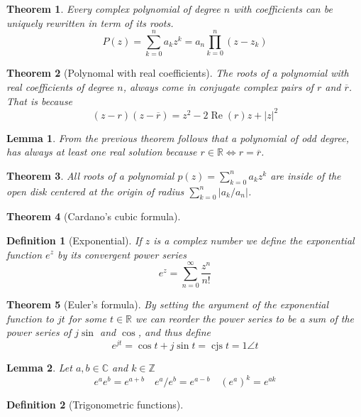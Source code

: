 \documentclass[twocolumn, margin=normal]{tex/hsrzf}
\newcommand\Zset{\mathbb{Z}}
\newcommand\Rset{\mathbb{R}}
\newcommand\Cset{\mathbb{C}}
\DeclareMathOperator\cjs{cjs}
\newcommand\conj[1]{\overline{#1}}
\newcommand\len[1]{\lvert#1\rvert}
\renewcommand\Re{\operatorname{Re}}
\theoremstyle{komfourzf}
\newtheorem{theorem}{Theorem}
\newtheorem{definition}{Definition}
\newtheorem{lemma}{Lemma}
\begin{document}
\begin{theorem}
  Every complex polynomial of degree \(n\) with coefficients can be \emph{uniquely} rewritten in term of its roots.
  \[
    P(z) = \sum_{k=0}^n a_k z^k = a_n \prod_{k=0}^{n} (z - z_k)
  \]
\end{theorem}

\begin{theorem}[Polynomal with real coefficients]
  The roots of a polynomial with real coefficients of degree \(n\), always come in conjugate complex pairs of \(r\) and \(\conj{r}\). That is because
  \[
    (z - r)(z - \conj{r}) = z^2 - 2\Re(r)z + \len{z}^2
  \]
\end{theorem}

\begin{lemma}
  From the previous theorem follows that a polynomial of \emph{odd} degree, has always at least one real solution because \(r \in\Rset \iff r = \conj{r}\).
\end{lemma}

\begin{theorem}
  All roots of a polynomial \(p(z) = \sum_{k=0}^n a_k z^k\) are inside of the open disk centered at the origin of radius \(\sum_{k=0}^n \len{a_k / a_n}\).
\end{theorem}

\begin{theorem}[Cardano's cubic formula]
\end{theorem}

\begin{definition}[Exponential]
  If \(z\) is a complex number we define the exponential function \(e^z\) by its convergent power series
  \[
    e^z = \sum_{n=0}^\infty \frac{z^n}{n!}
  \]
\end{definition}

\begin{theorem}[Euler's formula]
  By setting the argument of the exponential function to \(jt\) for some \(t \in\Rset\) we can reorder the power series to be a sum of the power series of \(j\sin\) and \(\cos\), and thus define
  \[
    e^{jt} = \cos t + j\sin t = \cjs t = 1\angle t
  \]
\end{theorem}

\begin{lemma} Let \(a,b \in\Cset\) and \(k\in\Zset\)
  \[
    e^a e^b = e^{a+b} \quad
    e^a / e^b = e^{a-b} \quad
    \left(e^a \right)^k = e^{ak}
  \]
\end{lemma}

\begin{definition}[Trigonometric functions]
\end{definition}
\end{document}
